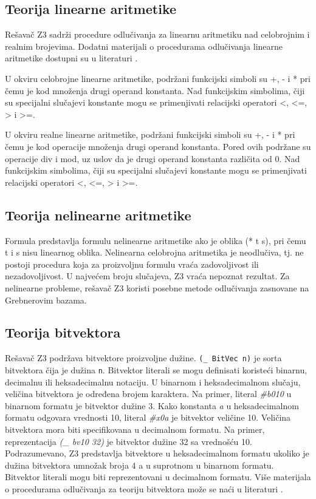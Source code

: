 \documentclass[12pt,oneside]{memoir}
\begin{document}
\subsection{Teorija linearne aritmetike} 

Rešavač Z3 sadrži procedure odlučivanja za linearnu aritmetiku nad celobrojnim i realnim brojevima. Dodatni materijali o procedurama odlučivanja linearne aritmetike dostupni su u literaturi \cite{FastLinearArithmetic}.
\par

U okviru celobrojne linearne aritmetike, podržani funkcijski simboli su +, - i * pri čemu je kod množenja drugi operand konstanta. Nad funkcijskim simbolima, čiji su specijalni slučajevi konstante mogu se primenjivati relacijski operatori <, <=, > i >=. 
\par
U okviru realne linearne aritmetike, podržani funkcijski simboli su +, - i * pri čemu je kod operacije množenja drugi operand konstanta. Pored ovih podržane su operacije div i mod, uz uslov da je drugi operand konstanta različita od 0. Nad funkcijskim simbolima, čiji su specijalni slučajevi konstante mogu se primenjivati relacijski operatori <, <=, > i >=. 
\par
\subsection{Teorija nelinearne aritmetike} 

Formula predstavlja formulu nelinearne aritmetike ako je oblika (* t s), pri čemu t i s nisu linearnog oblika.
Nelinearna celobrojna aritmetika je neodlučiva, tj. ne postoji procedura koja za proizvoljnu formulu vraća zadovoljivost ili nezadovoljivost. U najvećem broju slučajeva, Z3 vraća nepoznat rezultat. Za nelinearne probleme, rešavač Z3 koristi posebne metode odlučivanja zasnovane na Grebnerovim bazama. 


\subsection{Teorija bitvektora} 
Rešavač Z3 podržava bitvektore proizvoljne dužine. \texttt{(\_ BitVec n)} je sorta bitvektora čija je dužina \texttt{n}. Bitvektor literali se mogu definisati koristeći binarnu, decimalnu ili heksadecimalnu notaciju. U binarnom i heksadecimalnom slučaju, veličina bitvektora je određena brojem karaktera. Na primer, literal \textit{\#b010} u binarnom formatu je bitvektor dužine 3. Kako konstanta \textit{a} u heksadecimalnom formatu odgovara vrednosti 10, literal \textit{\#x0a} je bitvektor veličine 10. Veličina bitvektora mora biti specifikovana u decimalnom formatu. Na primer, reprezentacija \textit{(\_ bv10 32)} je bitvektor dužine 32 sa vrednošću 10. Podrazumevano, Z3 predstavlja bitvektore u heksadecimalnom formatu ukoliko je dužina bitvektora umnožak broja 4 a u suprotnom u binarnom formatu. Bitvektor literali mogu biti reprezentovani u decimalnom formatu. Više materijala o procedurama odlučivanja za teoriju bitvektora može se naći u literaturi \cite{DPBitvector}.
\end{document}
